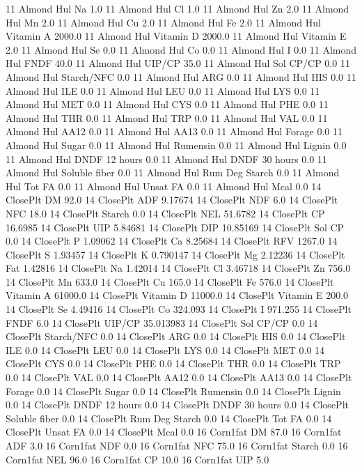 \documentclass[letterpaper,10pt,english]{sphinxmanual}
\begin{document}
\begin{sphinxVerbatim}[commandchars=\\\{\},numbers=left,firstnumber=1,stepnumber=1]
11 Almond Hul Na 1.0
11 Almond Hul Cl 1.0
11 Almond Hul Zn 2.0
11 Almond Hul Mn 2.0
11 Almond Hul Cu 2.0
11 Almond Hul Fe 2.0
11 Almond Hul Vitamin A 2000.0
11 Almond Hul Vitamin D 2000.0
11 Almond Hul Vitamin E 2.0
11 Almond Hul Se 0.0
11 Almond Hul Co 0.0
11 Almond Hul I 0.0
11 Almond Hul FNDF 40.0
11 Almond Hul UIP/CP 35.0
11 Almond Hul Sol CP/CP 0.0
11 Almond Hul Starch/NFC 0.0
11 Almond Hul ARG 0.0
11 Almond Hul HIS 0.0
11 Almond Hul ILE 0.0
11 Almond Hul LEU 0.0
11 Almond Hul LYS 0.0
11 Almond Hul MET 0.0
11 Almond Hul CYS 0.0
11 Almond Hul PHE 0.0
11 Almond Hul THR 0.0
11 Almond Hul TRP 0.0
11 Almond Hul VAL 0.0
11 Almond Hul AA\PYGZsh{}12 0.0
11 Almond Hul AA\PYGZsh{}13 0.0
11 Almond Hul \PYGZpc{} Forage 0.0
11 Almond Hul Sugar \PYGZpc{} 0.0
11 Almond Hul Rumensin 0.0
11 Almond Hul Lignin 0.0
11 Almond Hul DNDF 12 hours 0.0
11 Almond Hul DNDF 30 hours 0.0
11 Almond Hul Soluble fiber 0.0
11 Almond Hul Rum Deg Starch 0.0
11 Almond Hul Tot FA 0.0
11 Almond Hul Unsat FA 0.0
11 Almond Hul Mcal 0.0
14 ClosePlt DM 92.0
14 ClosePlt ADF 9.17674
14 ClosePlt NDF 6.0
14 ClosePlt NFC 18.0
14 ClosePlt Starch 0.0
14 ClosePlt NEL 51.6782
14 ClosePlt CP 16.6985
14 ClosePlt UIP 5.84681
14 ClosePlt DIP 10.85169
14 ClosePlt Sol CP 0.0
14 ClosePlt P 1.09062
14 ClosePlt Ca 8.25684
14 ClosePlt RFV 1267.0
14 ClosePlt S 1.93457
14 ClosePlt K 0.790147
14 ClosePlt Mg 2.12236
14 ClosePlt Fat 1.42816
14 ClosePlt Na 1.42014
14 ClosePlt Cl 3.46718
14 ClosePlt Zn 756.0
14 ClosePlt Mn 633.0
14 ClosePlt Cu 165.0
14 ClosePlt Fe 576.0
14 ClosePlt Vitamin A 61000.0
14 ClosePlt Vitamin D 11000.0
14 ClosePlt Vitamin E 200.0
14 ClosePlt Se 4.49416
14 ClosePlt Co 324.093
14 ClosePlt I 971.255
14 ClosePlt FNDF 6.0
14 ClosePlt UIP/CP 35.013983
14 ClosePlt Sol CP/CP 0.0
14 ClosePlt Starch/NFC 0.0
14 ClosePlt ARG 0.0
14 ClosePlt HIS 0.0
14 ClosePlt ILE 0.0
14 ClosePlt LEU 0.0
14 ClosePlt LYS 0.0
14 ClosePlt MET 0.0
14 ClosePlt CYS 0.0
14 ClosePlt PHE 0.0
14 ClosePlt THR 0.0
14 ClosePlt TRP 0.0
14 ClosePlt VAL 0.0
14 ClosePlt AA\PYGZsh{}12 0.0
14 ClosePlt AA\PYGZsh{}13 0.0
14 ClosePlt \PYGZpc{} Forage 0.0
14 ClosePlt Sugar \PYGZpc{} 0.0
14 ClosePlt Rumensin 0.0
14 ClosePlt Lignin 0.0
14 ClosePlt DNDF 12 hours 0.0
14 ClosePlt DNDF 30 hours 0.0
14 ClosePlt Soluble fiber 0.0
14 ClosePlt Rum Deg Starch 0.0
14 ClosePlt Tot FA 0.0
14 ClosePlt Unsat FA 0.0
14 ClosePlt Mcal 0.0
16 Corn1\PYGZpc{}fat DM 87.0
16 Corn1\PYGZpc{}fat ADF 3.0
16 Corn1\PYGZpc{}fat NDF 0.0
16 Corn1\PYGZpc{}fat NFC 75.0
16 Corn1\PYGZpc{}fat Starch 0.0
16 Corn1\PYGZpc{}fat NEL 96.0
16 Corn1\PYGZpc{}fat CP 10.0
16 Corn1\PYGZpc{}fat UIP 5.0

\end{sphinxVerbatim}
\end{document}
